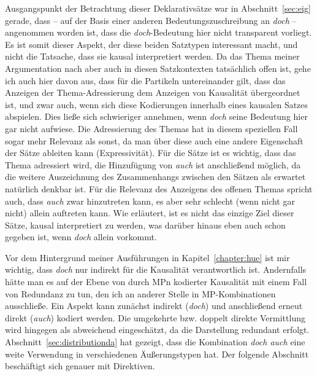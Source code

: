 Ausgangspunkt der Betrachtung dieser Deklarativsätze war in Abschnitt~\ref{sec:eig} gerade, dass – auf der Basis einer anderen Bedeutungszuschreibung an \textit{doch} – angenommen worden ist, dass die \textit{doch}-Bedeutung hier nicht transparent vorliegt. Es ist somit dieser Aspekt, der diese beiden Satztypen interessant macht, und nicht die Tatsache, dass sie kausal interpretiert werden. Da das Thema meiner Argumentation nach aber auch in diesen Satzkontexten tatsächlich offen ist, gehe ich auch hier davon aus, dass für die Partikeln untereinander gilt, dass das Anzeigen der Thema-Adressierung dem Anzeigen von Kausalität übergeordnet ist, und zwar auch, wenn sich diese Kodierungen innerhalb eines kausalen Satzes abspielen. Dies ließe sich schwieriger annehmen, wenn \textit{doch} seine Bedeutung hier gar nicht aufwiese. Die Adressierung des Themas hat in diesem speziellen Fall sogar mehr Relevanz als sonst, da man über diese auch eine andere Eigenschaft der Sätze ableiten kann (Expressivität). Für die Sätze ist es wichtig, dass das Thema adressiert wird, die Hinzufügung von \textit{auch} ist anschließend möglich, da die weitere Auszeichnung des Zusammenhangs zwischen den Sätzen als erwartet natürlich denkbar ist. Für die Relevanz des Anzeigens des offenen Themas spricht auch, dass \textit{auch} zwar hinzutreten kann, es aber sehr schlecht (wenn nicht gar nicht) allein auftreten kann. Wie erläutert, ist es nicht das einzige Ziel dieser Sätze, kausal interpretiert zu werden, was darüber hinaus eben auch schon gegeben ist, wenn \textit{doch} allein vorkommt. 

Vor dem Hintergrund meiner Ausführungen in Kapitel~\ref{chapter:hue} ist mir wichtig, dass \textit{doch} nur indirekt für die Kausalität verantwortlich ist. Andernfalls hätte man es auf der Ebene von durch MPn kodierter Kausalität mit einem Fall von Redundanz zu tun, den ich an anderer Stelle in MP-Kom\-bi\-na\-ti\-on\-en ausschließe. Ein Aspekt kann zunächst indirekt (\textit{doch}) und anschließend erneut direkt (\textit{auch}) kodiert werden. Die umgekehrte bzw. doppelt direkte Vermittlung wird hingegen als abwei\-chend eingeschätzt, da die Darstellung redundant erfolgt.\\

\noindent
Abschnitt~\ref{sec:distributionda} hat gezeigt, dass die Kombination \textit{doch auch} eine weite Verwendung in verschiedenen Äußerungstypen hat. Der folgende Abschnitt beschäftigt sich genauer mit Direktiven.

